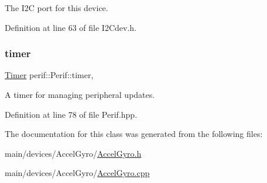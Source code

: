 The I2C port for this device. 

Definition at line 63 of file I2\+Cdev.\+h.

\mbox{\label{classperif_1_1Perif_acfa1256201bead82ccce1a0a8bcc24e1}} 
\subsubsection{\texorpdfstring{timer}{timer}}
{\footnotesize\ttfamily \mbox{\hyperlink{classTimer}{Timer}} perif\+::\+Perif\+::timer\hspace{0.3cm}{\ttfamily [protected]}, {\ttfamily [inherited]}}

A timer for managing peripheral updates. 

Definition at line 78 of file Perif.\+hpp.



The documentation for this class was generated from the following files\+:\begin{DoxyCompactItemize}
\item 
main/devices/\+Accel\+Gyro/\mbox{\hyperlink{AccelGyro_8h}{Accel\+Gyro.\+h}}\item 
main/devices/\+Accel\+Gyro/\mbox{\hyperlink{AccelGyro_8cpp}{Accel\+Gyro.\+cpp}}\end{DoxyCompactItemize}
